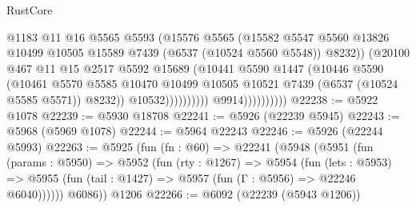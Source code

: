 \begin{lexlean}{RustCore}
\begin{coremodule}
                                        @1183
                                        @11
                                        @16
                                        @5565
                                        @5593
                                        (@15576
                                          @5565
                                          (@15582
                                            @5547
                                            @5560
                                            @13826
                                            @10499
                                            @10505
                                            @15589
                                            @7439
                                            (@6537 (@10524 @5560 @5548))
                                            @8232))
                                        (@20100
                                          @467
                                          @11
                                          @15
                                          @2517
                                          @5592
                                          @15689
                                          (@10441
                                            @5590
                                            @1447
                                            (@10446
                                              @5590
                                              (@10461
                                                @5570
                                                @5585
                                                @10470
                                                @10499
                                                @10505
                                                @10521
                                                @7439
                                                (@6537 (@10524 @5585 @5571))
                                                @8232))
                                            @10532))))))))))
                        @9914))))))))))
@22238 := @5922 @1078
@22239 := @5930 @18708
@22241 := @5926 (@22239 @5945)
@22243 := @5968 (@5969 @1078)
@22244 := @5964 @22243
@22246 := @5926 (@22244 @5993)
@22263 := @5925
    (fun (fn : @60) =>
    @22241
      (@5948
        (@5951
          (fun (params : @5950) =>
          @5952
            (fun (rty : @1267) =>
            @5954
              (fun (lets : @5953) =>
              @5955 (fun (tail : @1427) => @5957 (fun (Γ : @5956) => @22246 @6040))))))
        @6086))
    @1206
@22266 := @6092 (@22239 (@5943 @1206))

\end{coremodule}
\end{lexlean}
